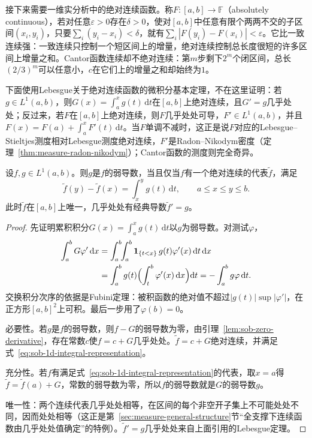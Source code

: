 接下来需要一维实分析中的绝对连续函数。称$F:[a,b]\to\mathbb F$（absolutely continuous），若对任意$\varepsilon>0$存在$\delta>0$，使对$[a,b]$中任意有限个两两不交的子区间$(x_i,y_i)$，只要$\sum_i(y_i-x_i)<\delta$，就有$\sum_i|F(y_i)-F(x_i)|<\varepsilon$。它比一致连续强：一致连续只控制一个短区间上的增量，绝对连续控制总长度很短的许多区间上增量之和。Cantor函数连续却不绝对连续：第$m$步剩下$2^m$个闭区间，总长$(2/3)^m$可以任意小，$c$在它们上的增量之和却始终为$1$。

下面使用Lebesgue关于绝对连续函数的微积分基本定理，不在这里证明：若$g\in L^1(a,b)$，则$G(x)=\int_a^xg(t)\,\mathrm dt$在$[a,b]$上绝对连续，且$G'=g$几乎处处；反过来，若$F$在$[a,b]$上绝对连续，则$F$几乎处处可导，$F'\in L^1(a,b)$，并且$F(x)=F(a)+\int_a^xF'(t)\,\mathrm dt$。当$F$单调不减时，这正是说$F$对应的Lebesgue--Stieltjes测度相对Lebesgue测度绝对连续，$F'$是Radon--Nikodym密度（定理~\ref{thm:measure-radon-nikodym}）；Cantor函数的测度则完全奇异。

\begin{theorem}[一维弱导数与绝对连续代表]
\label{thm:sob-1d-absolute-continuity}
设$f,g\in L^1(a,b)$。则$g$是$f$的弱导数，当且仅当$f$有一个绝对连续的代表$\tilde f$，满足
\begin{equation}
 \tilde f(y)-\tilde f(x)=\int_x^yg(t)\,\mathrm dt,\qquad a\le x\le y\le b .
 \label{eq:sob-1d-integral-representation}
\end{equation}
此时$\tilde f$在$[a,b]$上唯一，几乎处处有经典导数$\tilde f'=g$。
\end{theorem}

\begin{proof}
先证明累积积分$G(x)=\int_a^xg(t)\,\mathrm dt$以$g$为弱导数。对测试$\varphi$，
\[
 \begin{aligned}
 \int_a^bG\varphi'\,\mathrm dx&=\int_a^b\!\!\int_a^b\mathbf 1_{\{t<x\}}\,g(t)\varphi'(x)\,\mathrm dt\,\mathrm dx\\
 &=\int_a^bg(t)\Bigl(\int_t^b\varphi'(x)\,\mathrm dx\Bigr)\mathrm dt=-\int_a^bg\varphi\,\mathrm dt .
 \end{aligned}
\]
交换积分次序的依据是Fubini定理：被积函数的绝对值不超过$|g(t)|\sup|\varphi'|$，在正方形$[a,b]^2$上可积。最后一步用了$\varphi(b)=0$。

必要性。若$g$是$f$的弱导数，则$f-G$的弱导数为零，由引理~\ref{lem:sob-zero-derivative}，存在常数$c$使$f=c+G$几乎处处。$\tilde f=c+G$绝对连续，并满足式~\eqref{eq:sob-1d-integral-representation}。

充分性。若$f$有满足式~\eqref{eq:sob-1d-integral-representation}的代表，取$x=a$得$\tilde f=\tilde f(a)+G$，常数的弱导数为零，所以$f$的弱导数就是$G$的弱导数$g$。

唯一性：两个连续代表几乎处处相等，在区间的每个非空开子集上不可能处处不同，因而处处相等（这正是第~\ref{sec:measure-general-structure}节“全支撑下连续函数由几乎处处值确定”的特例）。$\tilde f'=g$几乎处处来自上面引用的Lebesgue定理。
\end{proof}

